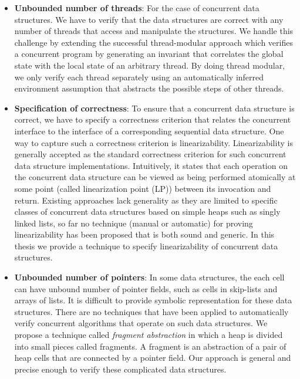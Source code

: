 \begin{itemize}
\item {\bf Unbounded number of threads}: For the case of concurrent data structures. We have to verify that the data structures are correct with any number of threads that access and manipulate the structures. We handle this challenge by extending the successful
thread-modular approach which verifies a concurrent program by generating
an invariant that correlates the global state with the local state of an arbitrary thread. By doing thread modular,  we only verify each thread
separately using an automatically inferred environment assumption that
abstracts the possible steps of other threads.
\item {\bf Specification of correctness}: To ensure that a concurrent data structure is correct, we have to specify a correctness criterion that relates the concurrent interface to the interface of a corresponding sequential data structure.  One way to capture such a correctness criterion is linearizability. Linearizability is generally accepted as the standard correctness criterion for such concurrent data structure implementations. Intuitively, it states that each operation on the concurrent data structure can be viewed as being performed atomically at some point (called linearization point (LP)) between its invocation and return. Existing approaches lack generality as they are limited to specific classes of concurrent data structures based on simple heaps such as singly linked lists, so far no technique (manual or automatic) for proving linearizability has been proposed that is both sound and generic. In this thesis we provide a technique to specify linearizability of concurrent data structures. 
\item {\bf Unbounded number of pointers}: In some data structures, the each cell can have unbound number of pointer fields,  such as cells in skip-lists and arrays of lists. It is difficult to provide symbolic representation for these data structures. There are no techniques that have been applied to automatically verify concurrent algorithms that operate on such data structures. We propose a technique called \emph{fragment abstraction} in which a heap is divided into small pieces called fragments. A fragment is an abstraction
of a pair of heap cells that are connected by a pointer field. Our approach is general and precise enough to verify these complicated data structures. 
\end{itemize}

